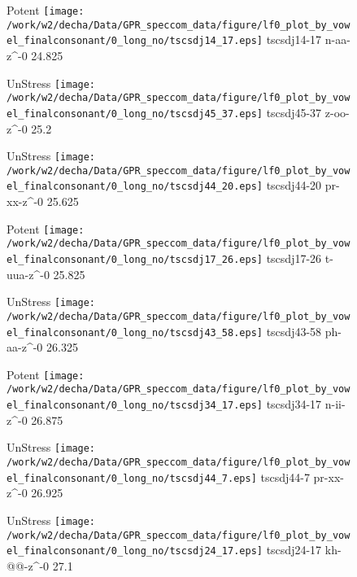 \documentclass{article}
\begin{document}
\begin{figure}[t]
\begin{minipage}[b]{.24\textwidth}
\colorbox{Apricot}{Potent}
\centering
\texttt{[image: /work/w2/decha/Data/GPR\_speccom\_data/figure/lf0\_plot\_by\_vowel\_finalconsonant/0\_long\_no/tscsdj14\_17.eps]}
tscsdj14-17 n-aa-z\textasciicircum-0 24.825
\end{minipage}
\begin{minipage}[b]{.24\textwidth}
UnStress
\centering
\texttt{[image: /work/w2/decha/Data/GPR\_speccom\_data/figure/lf0\_plot\_by\_vowel\_finalconsonant/0\_long\_no/tscsdj45\_37.eps]}
tscsdj45-37 z-oo-z\textasciicircum-0 25.2
\end{minipage}
\begin{minipage}[b]{.24\textwidth}
UnStress
\centering
\texttt{[image: /work/w2/decha/Data/GPR\_speccom\_data/figure/lf0\_plot\_by\_vowel\_finalconsonant/0\_long\_no/tscsdj44\_20.eps]}
tscsdj44-20 pr-xx-z\textasciicircum-0 25.625
\end{minipage}
\begin{minipage}[b]{.24\textwidth}
\colorbox{Apricot}{Potent}
\centering
\texttt{[image: /work/w2/decha/Data/GPR\_speccom\_data/figure/lf0\_plot\_by\_vowel\_finalconsonant/0\_long\_no/tscsdj17\_26.eps]}
tscsdj17-26 t-uua-z\textasciicircum-0 25.825
\end{minipage}
\end{figure}
\clearpage
\begin{figure}[t]
\begin{minipage}[b]{.24\textwidth}
UnStress
\centering
\texttt{[image: /work/w2/decha/Data/GPR\_speccom\_data/figure/lf0\_plot\_by\_vowel\_finalconsonant/0\_long\_no/tscsdj43\_58.eps]}
tscsdj43-58 ph-aa-z\textasciicircum-0 26.325
\end{minipage}
\begin{minipage}[b]{.24\textwidth}
\colorbox{Apricot}{Potent}
\centering
\texttt{[image: /work/w2/decha/Data/GPR\_speccom\_data/figure/lf0\_plot\_by\_vowel\_finalconsonant/0\_long\_no/tscsdj34\_17.eps]}
tscsdj34-17 n-ii-z\textasciicircum-0 26.875
\end{minipage}
\begin{minipage}[b]{.24\textwidth}
UnStress
\centering
\texttt{[image: /work/w2/decha/Data/GPR\_speccom\_data/figure/lf0\_plot\_by\_vowel\_finalconsonant/0\_long\_no/tscsdj44\_7.eps]}
tscsdj44-7 pr-xx-z\textasciicircum-0 26.925
\end{minipage}
\begin{minipage}[b]{.24\textwidth}
UnStress
\centering
\texttt{[image: /work/w2/decha/Data/GPR\_speccom\_data/figure/lf0\_plot\_by\_vowel\_finalconsonant/0\_long\_no/tscsdj24\_17.eps]}
tscsdj24-17 kh-@@-z\textasciicircum-0 27.1
\end{minipage}
\end{figure}
\end{document}
